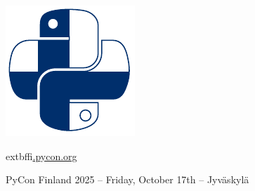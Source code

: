 \documentclass[12pt,aspectratio=169]{beamer}
\begin{document}

\begin{frame}
\vfill
\huge
\centering \includegraphics[height=0.50\paperheight]{images/PyCon-Finland.pdf}
\par
	extbf{\href{https://pyconfi.ploneconf.org}{fi.pycon.org}}
\par
\normalsize
\vfill
PyCon Finland 2025 – Friday, October 17th – Jyväskylä \\
\vfill
\end{frame}
\end{document}
